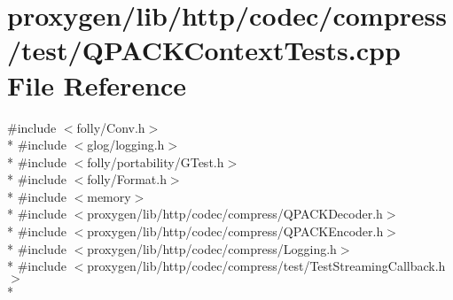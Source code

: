 \section{proxygen/lib/http/codec/compress/test/\+Q\+P\+A\+C\+K\+Context\+Tests.cpp File Reference}
\label{QPACKContextTests_8cpp}
{\ttfamily \#include $<$folly/\+Conv.\+h$>$}\\*
{\ttfamily \#include $<$glog/logging.\+h$>$}\\*
{\ttfamily \#include $<$folly/portability/\+G\+Test.\+h$>$}\\*
{\ttfamily \#include $<$folly/\+Format.\+h$>$}\\*
{\ttfamily \#include $<$memory$>$}\\*
{\ttfamily \#include $<$proxygen/lib/http/codec/compress/\+Q\+P\+A\+C\+K\+Decoder.\+h$>$}\\*
{\ttfamily \#include $<$proxygen/lib/http/codec/compress/\+Q\+P\+A\+C\+K\+Encoder.\+h$>$}\\*
{\ttfamily \#include $<$proxygen/lib/http/codec/compress/\+Logging.\+h$>$}\\*
{\ttfamily \#include $<$proxygen/lib/http/codec/compress/test/\+Test\+Streaming\+Callback.\+h$>$}\\*
